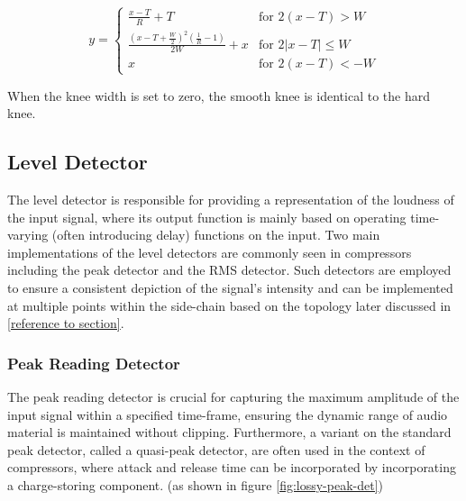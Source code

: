\documentclass[10pt]{article}
\begin{document}
\begin{multicols*}{2}
                    \begin{equation}
                        y=
                        \begin{cases}
                            \frac{x-T}{R}+T & \text{for $2(x-T)>W$}\\[5pt]
                            \frac{(x-T+\frac{W}{2})^2(\frac{1}{R}-1)}{2W}+x & \text{for $2\left\lvert x-T\right\rvert\leq W$}\\[5pt]
                            x & \text{for $2(x-T)<-W$}
                        \end{cases}
                        \label{eq:gain-comp}
                    \end{equation}

                When the knee width is set to zero, the smooth knee is identical to the hard knee.
            
            \subsection{Level Detector}
                The level detector is responsible for providing a representation of the loudness of the input signal, where its output function is mainly based on operating time-varying (often introducing delay) functions on the input. Two main implementations of the level detectors are commonly seen in compressors including the peak detector and the RMS detector. Such detectors are employed to ensure a consistent depiction of the signal's intensity and can be implemented at multiple points within the side-chain based on the topology later discussed in \ref{reference to section}.
                
                \subsubsection{Peak Reading Detector}
                    The peak reading detector is crucial for capturing the maximum amplitude of the input signal within a specified time-frame, ensuring the dynamic range of audio material is maintained without clipping. Furthermore, a variant on the standard peak detector, called a quasi-peak detector, are often used in the context of compressors, where attack and release time can be incorporated by incorporating a charge-storing component. (as shown in figure \ref{fig:lossy-peak-det})


\end{multicols*}
\end{document}
